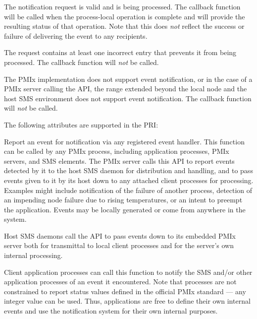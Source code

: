 \begin{constantdesc}
\item {} The notification request is valid and is being processed. The callback function will be called when the process-local operation is complete and will provide the resulting status of that operation. Note that this does \textit{not} reflect the success or failure of delivering the event to any recipients.
\item {} The request contains at least one incorrect entry that prevents it from being processed. The callback function will \textit{not} be called.
\item {} The \ac{PMIx} implementation does not support event notification, or in the case of a \ac{PMIx} server calling the API, the range extended beyond the local node and the host \ac{SMS} environment does not support event notification. The callback function will \textit{not} be called.
\end{constantdesc}

\priattr
The following attributes are supported in the \ac{PRI}:


\descr

Report an event for notification via any
registered event handler. This function can be called by any \ac{PMIx} process, including application processes, \ac{PMIx} servers, and \ac{SMS} elements. The \ac{PMIx} server calls this \ac{API} to report events detected
by it to the host \ac{SMS} daemon for distribution and handling, and to pass events given to it by its host down to any attached client processes for processing. Examples might include notification of the failure of another process, detection of an impending node failure due to rising temperatures, or an intent to preempt the application. Events may be locally generated or come from anywhere in the system.

Host \ac{SMS} daemons call the API to pass events down to its embedded \ac{PMIx} server both for transmittal to local client processes and for the server's own internal processing.

Client application processes can call this function to notify the \ac{SMS} and/or other application processes of an event it encountered. Note that processes are not constrained to report status values defined in the official \ac{PMIx} standard --- any integer value can be used. Thus, applications are free to define their own internal events and use the notification system for their own internal purposes.

